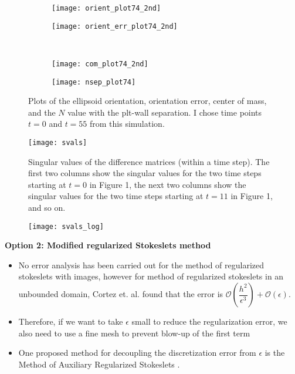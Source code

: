 \documentclass{article}
\begin{document}
\begin{figure}
  \centering
  \begin{subfigure}{0.49\textwidth}
    \texttt{[image: orient\_plot74\_2nd]}
  \end{subfigure}
  \hfill
  \begin{subfigure}{0.49\textwidth}
    \texttt{[image: orient\_err\_plot74\_2nd]}
  \end{subfigure}
  \\
  \begin{subfigure}{0.49\textwidth}
    \texttt{[image: com\_plot74\_2nd]}
  \end{subfigure}
  \hfill
  \begin{subfigure}{0.49\textwidth}
    \texttt{[image: nsep\_plot74]}
  \end{subfigure}  
  \caption{Plots of the ellipsoid orientation, orientation error,
    center of mass, and the $N$ value with the plt-wall
    separation. I chose time points $t=0$ and $t = 55$ from this
    simulation.} 
  \label{fig:plt74}
\end{figure}

\begin{figure}
  \centering
  \texttt{[image: svals]}
  \caption{Singular values of the difference matrices (within a time step). The first two
    columns show the singular values for the two time steps starting
    at $t=0$ in Figure 1, the next two columns show the singular values for the
    two time steps starting at $t = 11$ in Figure 1, and so on.}
  \label{fig:svals}
\end{figure}

\begin{figure}
  \centering
  \texttt{[image: svals\_log]}
  \caption{}
  \label{fig:svals_log}
\end{figure}

\textbf{Option 2: Modified regularized Stokeslets method}
\begin{itemize}
\item No error analysis has been carried out for the method of
  regularized stokeslets with images, however for method of
  regularized stokeslets in an unbounded domain, Cortez
  et. al. \cite{Cortez2005} found that the error is
  $\mathcal{O}\left(\dfrac{h^2}{\epsilon^3}\right) +
  \mathcal{O}\left(\epsilon\right)$.
\item Therefore, if we want to take $\epsilon$ small to reduce the
  regularization error, we also need to use a fine mesh to prevent
  blow-up of the first term
\item One proposed method for decoupling the discretization error from
  $\epsilon$ is the Method of Auxiliary Regularized Stokeslets
  \cite{Barrero-Gil2013}.
\end{itemize}
\end{document}
